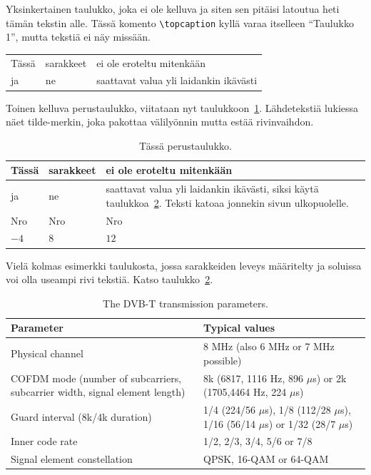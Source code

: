 Yksinkertainen taulukko, joka ei ole kelluva ja siten sen pitäisi
latoutua heti tämän tekstin alle. Tässä komento \verb!\topcaption!
kyllä varaa itselleen ``Taulukko 1'', mutta tekstiä ei näy missään.

\begin{tabular}{|l|l|l|} 
\hline
Tässä & sarakkeet & ei ole eroteltu mitenkään \\
ja    & ne        & saattavat valua yli laidankin ikävästi \\
\hline
\end{tabular}

Toinen kelluva perustaulukko, viitataan nyt taulukkoon~\ref{table:perustaulu}.
Lähdetekstiä lukiessa näet tilde-merkin, joka pakottaa välilyönnin
mutta estää rivinvaihdon.

\begin{table}[ht]
\caption{Tässä perustaulukko.}
\label{table:perustaulu}
\begin{center}
\begin{tabular}{|l|l|l|} 
\hline
Tässä & sarakkeet & ei ole eroteltu mitenkään \\
\hline
ja    & ne        & saattavat valua yli laidankin ikävästi, %
                   siksi käytä taulukkoa~\ref{table:dvbt_param}. %
                   Teksti katoaa jonnekin sivun ulkopuolelle. \\
\hline
Nro   & Nro       & Nro \\
\hline
$-4$  & $8$       & $12$ \\
\hline
\end{tabular}
\end{center}
\end{table}

Vielä kolmas esimerkki taulukosta, jossa sarakkeiden leveys määritelty
ja soluissa voi olla useampi rivi tekstiä. Katso
taulukko~\ref{table:dvbt_param}.

\begin{table}[th]
\caption{The DVB-T transmission parameters.}
\label{table:dvbt_param}
\begin{center}
\begin{tabular}{|p{}|p{}|} 
    \hline
Parameter & Typical values \\
    \hline
    \hline
Physical channel&8 MHz (also 6 MHz or 7 MHz possible)\\ 
    \hline
COFDM mode (number of subcarriers, 
subcarrier width, 
signal element length)
&8k (6817, 1116 Hz, 896 $\mu$s) or 
2k (1705,4464 Hz, 224 $\mu$s)\\
    \hline
Guard interval (8k/4k duration)
&1/4 (224/56 $\mu$s), 1/8 (112/28 $\mu$s),
   1/16 (56/14 $\mu$s) or 1/32 (28/7 $\mu$s)\\
    \hline
Inner code rate &1/2, 2/3, 3/4, 5/6 or 7/8\\
    \hline
Signal  element constellation 
&QPSK, 16-QAM or 64-QAM \\
    \hline
\end{tabular}
\end{center}
\end{table}



